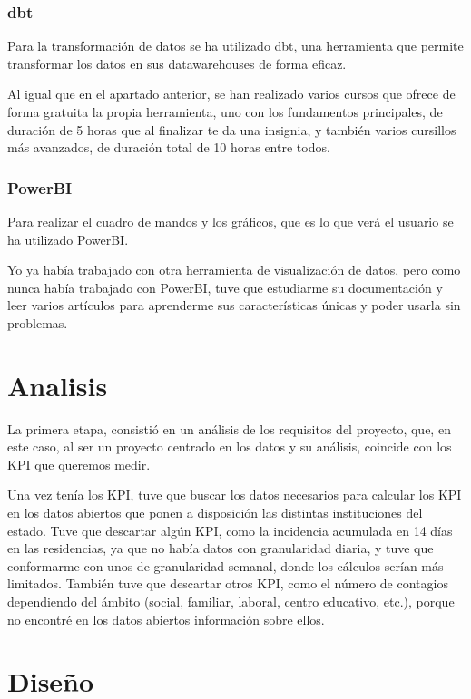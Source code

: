 \subsubsection{dbt}

Para la transformación de datos se ha utilizado dbt, una herramienta que permite transformar los datos en sus datawarehouses de forma eficaz.

Al igual que en el apartado anterior, se han realizado varios cursos que ofrece de forma gratuita la propia herramienta, uno con los fundamentos principales, de duración de 5 horas que al finalizar te da una insignia, y también varios cursillos más avanzados, de duración total de 10 horas entre todos.

\subsubsection{PowerBI}

Para realizar el cuadro de mandos y los gráficos, que es lo que verá el usuario se ha utilizado PowerBI.

Yo ya había trabajado con otra herramienta de visualización de datos, pero como nunca había trabajado con PowerBI, tuve que estudiarme su documentación y leer varios artículos para aprenderme sus características únicas y poder usarla sin problemas.

\section{Analisis}

La primera etapa, consistió en un análisis de los requisitos del proyecto, que, en este caso, al ser un proyecto centrado en los datos y su análisis, coincide con los KPI que queremos medir.

Una vez tenía los KPI, tuve que buscar los datos necesarios para calcular los KPI en los datos abiertos que ponen a disposición las distintas instituciones del estado. Tuve que descartar algún KPI, como la incidencia acumulada en 14 días en las residencias, ya que no había datos con granularidad diaria, y tuve que conformarme con unos de granularidad semanal, donde los cálculos serían más limitados. También tuve que descartar otros KPI, como el número de contagios dependiendo del ámbito (social, familiar, laboral, centro educativo, etc.), porque no encontré en los datos abiertos información sobre ellos.

\section{Diseño}

